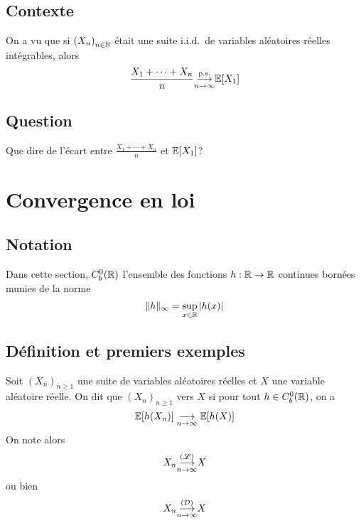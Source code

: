 \subsection*{Contexte}

On a vu que si \({(X_n)}_{n\in\mathbb{N}}\) était une suite
i.i.d.\ de variables aléatoires réelles intégrables,
alors
\begin{equation*}
    \frac{X_1 + \cdots + X_n}{n} \underset{n\to\infty}{{\overset{\text{p.s.}}{\longrightarrow}}} \mathbb{E}[X_1]
\end{equation*}

\subsection*{Question}

Que dire de l'écart entre \(\frac{X_1 + \cdots + X_n}{n}\) et \(\mathbb{E}[X_1]\)?

\section{Convergence en loi}

\subsection*{Notation}

Dans cette section, \(C_b^0(\mathbb{R})\) l'ensemble
des fonctions \(h:\mathbb{R}\to\mathbb{R}\) continues bornées
munies de la norme
\begin{equation*}
    \mathopen{}\left\|h\right\|\mathclose{}_{\infty} = \sup_{x\in\mathbb{R}} |h(x)|
\end{equation*}

\subsection{Définition et premiers exemples}

\begin{definition}
    Soit \({(X_n)}_{n\geq 1}\) une suite de variables aléatoires réelles
    et \(X\) une variable aléatoire réelle. On dit que \({(X_n)}_{n\geq 1}\)
     vers \(X\) si pour tout \(h\in C_b^0(\mathbb{R})\),
    on a
    \begin{equation*}
        \mathbb{E}[h(X_n)] \underset{n\to\infty}{\longrightarrow} \mathbb{E}[h(X)]
    \end{equation*}
    On note alors
    \begin{equation*}
        X_n \underset{n\to\infty}{{\overset{(\mathscr{L})}{\longrightarrow}}} X
    \end{equation*}
    ou bien
    \begin{equation*}
        X_n \underset{n\to\infty}{{\overset{(\mathcal{D})}{\longrightarrow}}} X
    \end{equation*}
\end{definition}

